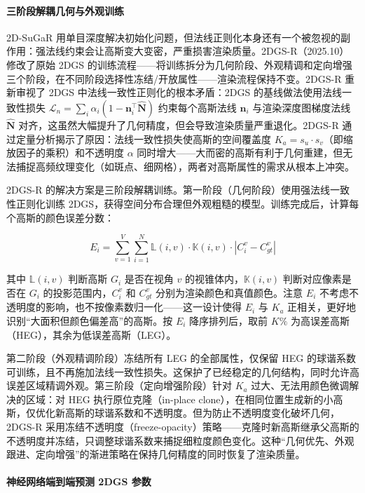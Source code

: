 \paragraph{三阶段解耦几何与外观训练}

2D-SuGaR 用单目深度解决初始化问题，但法线正则化本身还有一个被忽视的副作用：强法线约束会让高斯变大变密，严重损害渲染质量。2DGS-R（2025.10）~\cite{2510_16837} 修改了原始 2DGS 的训练流程——将训练拆分为几何阶段、外观精调和定向增强三个阶段，在不同阶段选择性冻结/开放属性——渲染流程保持不变。2DGS-R 重新审视了 2DGS 中法线一致性正则化的根本矛盾：2DGS 的基线做法使用法线一致性损失 $\mathcal{L}_n = \sum_i \alpha_i(1 - \mathbf{n}_i^\top \hat{\mathbf{N}})$ 约束每个高斯法线 $\mathbf{n}_i$ 与渲染深度图梯度法线 $\hat{\mathbf{N}}$ 对齐，这虽然大幅提升了几何精度，但会导致渲染质量严重退化。2DGS-R 通过定量分析揭示了原因：法线一致性损失使高斯的空间覆盖度 $K_a = s_u \cdot s_v$（即缩放因子的乘积）和不透明度 $\alpha$ 同时增大——大而密的高斯有利于几何重建，但无法捕捉高频纹理变化（如斑点、细网格），两者对高斯属性的需求从根本上冲突。

2DGS-R 的解决方案是三阶段解耦训练。第一阶段（几何阶段）使用强法线一致性正则化训练 2DGS，获得空间分布合理但外观粗糙的模型。训练完成后，计算每个高斯的颜色误差分数：

\begin{equation}
    E_i = \sum_{v=1}^{V} \sum_{i=1}^{N} \mathbb{L}(i,v) \cdot \mathbb{K}(i,v) \cdot |C_i^v - C_{gt}^v|
\end{equation}

其中 $\mathbb{L}(i,v)$ 判断高斯 $G_i$ 是否在视角 $v$ 的视锥体内，$\mathbb{K}(i,v)$ 判断对应像素是否在 $G_i$ 的投影范围内，$C_i^v$ 和 $C_{gt}^v$ 分别为渲染颜色和真值颜色。注意 $E_i$ 不考虑不透明度的影响，也不按像素数归一化——这一设计使得 $E_i$ 与 $K_a$ 正相关，更好地识别“大面积但颜色偏差高”的高斯。按 $E_i$ 降序排列后，取前 $K\%$ 为高误差高斯（HEG），其余为低误差高斯（LEG）。

第二阶段（外观精调阶段）冻结所有 LEG 的全部属性，仅保留 HEG 的球谐系数可训练，且不再施加法线一致性损失。这保护了已经稳定的几何结构，同时允许高误差区域精调外观。第三阶段（定向增强阶段）针对 $K_a$ 过大、无法用颜色微调解决的区域：对 HEG 执行原位克隆（in-place clone），在相同位置生成新的小高斯，仅优化新高斯的球谐系数和不透明度。但为防止不透明度变化破坏几何，2DGS-R 采用冻结不透明度（freeze-opacity）策略——克隆时新高斯继承父高斯的不透明度并冻结，只调整球谐系数来捕捉细粒度颜色变化。这种“几何优先、外观跟进、定向增强”的渐进策略在保持几何精度的同时恢复了渲染质量。

\paragraph{神经网络端到端预测 2DGS 参数}


